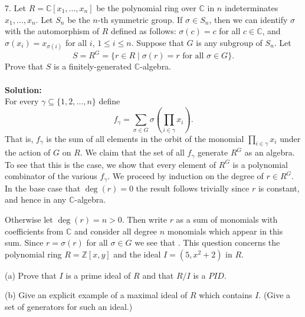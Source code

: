 \documentclass[11pt]{article}
\newcommand{\Z}{\mathbb{Z}}
\newcommand{\C}{\mathbb{C}}
\begin{document}
7. Let $R = \C[x_1, ..., x_n]$ be the polynomial ring over $\C$ in $n$ indeterminates
$x_1, ..., x_n$. Let $S_n$ be the $n$-th symmetric group. If $\sigma \in S_n$, then we can identify $\sigma $ with the
automorphism of $R$ defined as follows: $\sigma (c) = c$ for all $c \in\C$, and $\sigma (x_i) = x_{\sigma(i)}$
for all $i$,
$1 \le i \le n$. Suppose that $G$ is any subgroup of $S_n$. Let
 \[S = R^G = \{r\in R\mid \sigma(r) = r \text{ for all } \sigma\in G\}.
\]
Prove that $S$ is a finitely-generated $\C$-algebra.\\\\
\textbf{Solution:}\\
For every $\gamma\subseteq \{1,2,\ldots, n\}$ define \[
f_\gamma  = \sum_{\sigma\in G} \sigma\left(\prod_{i\in \gamma} x_i\right).
\]
That is, $f_\gamma$ is the sum of all elements in the orbit of the monomial $\prod_{i\in \gamma} x_i$ under the action of $G$ on $R$. We claim that the set of all $f_\gamma$ generate $R^G$ as an algebra. To see that this is the case, we show that every element of $R^G$ is a polynomial combinator of the various $f_\gamma$. We proceed by induction on the degree of $r\in R^G$. 
In the base case that $\deg(r) = 0$ the result follows trivially since $r$ is constant, and hence in any $\C$-algebra.

Otherwise let $\deg(r) = n >0$. Then write $r$ as a sum of monomials with coefficients from $\C$ and consider all degree $n$ monomials which appear in this sum. Since $r = \sigma(r)$ for all $\sigma\in G$ we see that 
. This question concerns the polynomial ring $R = \Z[x, y]$ and the ideal
$I = (5, x^2 + 2)$ in $R$.

(a) Prove that $I$ is a prime ideal of $R$ and that $R/I$ is a $PID$.

(b) Give an explicit example of a maximal ideal of $R$ which contains $I$.
(Give a set of generators for such an ideal.)
\end{document}
